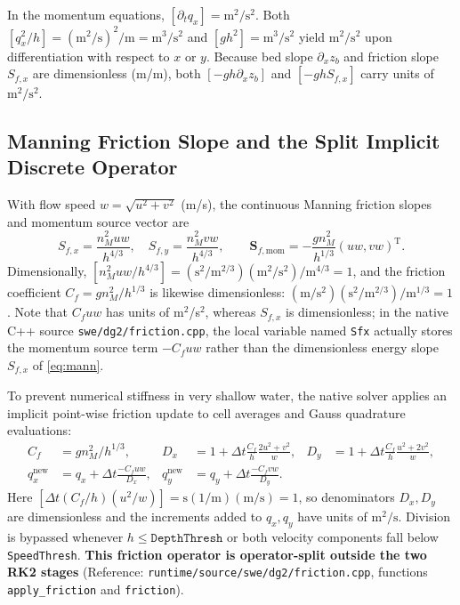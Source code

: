 \documentclass[11pt,a4paper]{article}
\newcommand{\src}[1]{\nolinkurl{#1}}
\newcommand{\unit}[1]{\mathrm{#1}}
\begin{document}
In the momentum equations, $[\partial_t q_x]=\unit{m^2/s^2}$. Both $[q_x^2/h]=(\unit{m^2/s})^2/\unit m=\unit{m^3/s^2}$ and $[gh^2]=\unit{m^3/s^2}$ yield $\unit{m^2/s^2}$ upon differentiation with respect to $x$ or $y$. Because bed slope $\partial_xz_b$ and friction slope $S_{f,x}$ are dimensionless (m/m), both $[-gh\partial_xz_b]$ and $[-gh S_{f,x}]$ carry units of $\unit{m^2/s^2}$.

\subsection{Manning Friction Slope and the Split Implicit Discrete Operator}
With flow speed $w=\sqrt{u^2+v^2}$ (m/s), the continuous Manning friction slopes and momentum source vector are
\begin{equation}
 S_{f,x}=\frac{n_M^2uw}{h^{4/3}},\quad S_{f,y}=\frac{n_M^2vw}{h^{4/3}},\qquad
 \boldsymbol S_{f,\mathrm{mom}}=-\frac{g n_M^2}{h^{1/3}}(uw,vw)^{\mathrm T}.\label{eq:mann}
\end{equation}
Dimensionally, $[n_M^2uw/h^{4/3}]=(\unit{s^2/m^{2/3}})(\unit{m^2/s^2})/\unit{m^{4/3}}=1$, and the friction coefficient $C_f=gn_M^2/h^{1/3}$ is likewise dimensionless: $(\unit{m/s^2})(\unit{s^2/m^{2/3}})/\unit{m^{1/3}}=1$. Note that $C_fuw$ has units of m$^2$/s$^2$, whereas $S_{f,x}$ is dimensionless; in the native C++ source \src{swe/dg2/friction.cpp}, the local variable named \texttt{Sfx} actually stores the momentum source term $-C_fuw$ rather than the dimensionless energy slope $S_{f,x}$ of \eqref{eq:mann}.

To prevent numerical stiffness in very shallow water, the native solver applies an implicit point-wise friction update to cell averages and Gauss quadrature evaluations:
\begin{align}
 C_f&=gn_M^2/h^{1/3}, & D_x&=1+\Delta t\frac{C_f}{h}\frac{2u^2+v^2}{w},
 & D_y&=1+\Delta t\frac{C_f}{h}\frac{u^2+2v^2}{w},\label{eq:fricden}\\
 q_x^{\mathrm{new}}&=q_x+\Delta t\frac{-C_fuw}{D_x}, &
 q_y^{\mathrm{new}}&=q_y+\Delta t\frac{-C_fvw}{D_y}.\label{eq:fricdisc}
\end{align}
Here $[\Delta t(C_f/h)(u^2/w)]=\unit s(1/\unit m)(\unit{m/s})=1$, so denominators $D_x,D_y$ are dimensionless and the increments added to $q_x,q_y$ have units of $\unit{m^2/s}$. Division is bypassed whenever $h\leq\texttt{DepthThresh}$ or both velocity components fall below \texttt{SpeedThresh}. \textbf{This friction operator is operator-split outside the two RK2 stages} (Reference: \src{runtime/source/swe/dg2/friction.cpp}, functions \texttt{apply\_friction} and \texttt{friction}).
\end{document}

